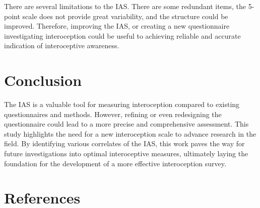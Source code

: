 \documentclass[
  jou,
  floatsintext,
  longtable,
  nolmodern,
  notxfonts,
  notimes,
  colorlinks=true,linkcolor=blue,citecolor=blue,urlcolor=blue]{apa7}
\begin{document}
There are several limitations to the IAS. There are some redundant
items, the 5-point scale does not provide great variability, and the
structure could be improved. Therefore, improving the IAS, or creating a
new questionnaire investigating interoception could be useful to
achieving reliable and accurate indication of interoceptive awareness.

\section{Conclusion}\label{conclusion}

The IAS is a valuable tool for measuring interoception compared to
existing questionnaires and methods. However, refining or even
redesigning the questionnaire could lead to a more precise and
comprehensive assessment. This study highlights the need for a new
interoception scale to advance research in the field. By identifying
various correlates of the IAS, this work paves the way for future
investigations into optimal interoceptive measures, ultimately laying
the foundation for the development of a more effective interoception
survey.

\section{References}\label{references}
\end{document}
